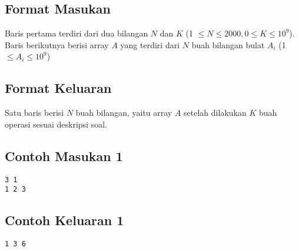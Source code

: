 \documentclass{article}
\begin{document}


\subsection*{Format Masukan}


Baris pertama terdiri dari dua bilangan $N$ dan $K$ (1 $\leq N \leq 2000, 0 \leq K \leq 10^9$).
Baris berikutnya berisi array $A$ yang terdiri dari $N$ buah bilangan bulat $A_i$ (1 $ \leq A_i \leq 10^9 $)

\subsection*{Format Keluaran}
Satu baris berisi $N$ buah bilangan, yaitu array $A$ setelah dilakukan $K$ buah operasi sesuai deskripsi soal.
\begin{multicols}{2}
\subsection*{Contoh Masukan 1}
\begin{lstlisting}
3 1
1 2 3
\end{lstlisting}
\null
\columnbreak
\subsection*{Contoh Keluaran 1}
\begin{lstlisting}
1 3 6
\end{lstlisting}
\end{multicols}



\pagebreak
\end{document}
